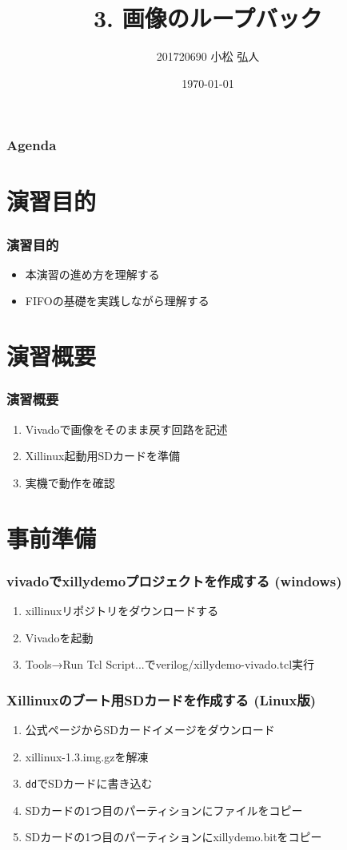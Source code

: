 ﻿\documentclass[dvipdfmx]{beamer}
\title{3. 画像のループバック}
\author{201720690 小松 弘人}
\date{\today}
\begin{document}
\maketitle

\begin{frame}
	\frametitle{Agenda}
	\tableofcontents
\end{frame}

\section{演習目的}
\begin{frame}
	\frametitle{演習目的}
	\begin{itemize}
		\item
			本演習の進め方を理解する
			\vfill
		\item
			FIFOの基礎を実践しながら理解する
	\end{itemize}
\end{frame}

\section{演習概要}
\begin{frame}
	\frametitle{演習概要}
	\begin{enumerate}
		\item
			Vivadoで画像をそのまま戻す回路を記述
			\vfill
		\item
			Xillinux起動用SDカードを準備
			\vfill
		\item
			実機で動作を確認
	\end{enumerate}
\end{frame}

\section{事前準備}
\begin{frame}
	\frametitle{vivadoでxillydemoプロジェクトを作成する (windows)}
	\begin{enumerate}
		\item
			xillinuxリポジトリをダウンロードする
			\vfill
		\item
			Vivadoを起動
			\vfill
		\item
			Tools→Run Tcl Script...でverilog/xillydemo-vivado.tcl実行
	\end{enumerate}
\end{frame}

\begin{frame}[fragile]
	\frametitle{Xillinuxのブート用SDカードを作成する (Linux版)}
	\begin{enumerate}
		\item
			公式ページからSDカードイメージをダウンロード
			\vfill
		\item
			xillinux-1.3.img.gzを解凍
			\vfill
		\item
			\verb|dd|でSDカードに書き込む
			\vfill
		\item
			SDカードの1つ目のパーティションにファイルをコピー
			\vfill
		\item
			SDカードの1つ目のパーティションにxillydemo.bitをコピー
	\end{enumerate}
\end{frame}
\end{document}
